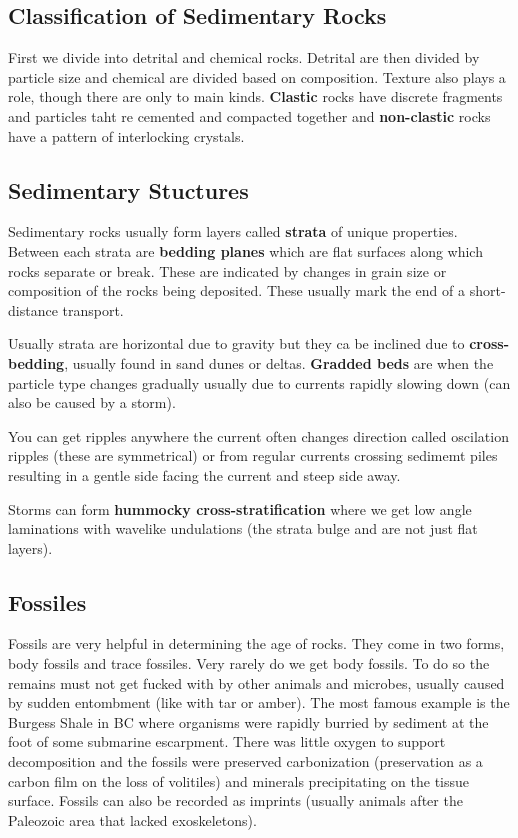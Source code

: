 \documentclass{article}
\begin{document}
\subsection*{Classification of Sedimentary Rocks} %
\label{sub:classification_of_sedimentary_rocks}
First we divide into detrital and chemical rocks. Detrital are then divided by particle size and chemical are divided based on composition. Texture also plays a role, though there are only to main kinds. \textbf{Clastic} rocks have discrete fragments and particles taht re cemented and compacted together and \textbf{non-clastic} rocks have a pattern of interlocking crystals.

\subsection*{Sedimentary Stuctures} %
\label{sub:sedimentary_stuctures}
Sedimentary rocks usually form layers called \textbf{strata} of unique properties. Between each strata are \textbf{bedding planes} which are flat surfaces along which rocks separate or break. These are indicated by changes in grain size or composition of the rocks being deposited. These usually mark the end of a short-distance transport.

Usually strata are horizontal due to gravity but they ca be inclined due to \textbf{cross-bedding}, usually found in sand dunes or deltas. \textbf{Gradded beds} are when the particle type changes gradually usually due to currents rapidly slowing down (can also be caused by a storm).

You can get ripples anywhere the current often changes direction called oscilation ripples (these are symmetrical) or from  regular currents crossing sedimemt piles resulting in a gentle side facing the current and steep side away.

Storms can form \textbf{hummocky cross-stratification} where we get low angle laminations with wavelike undulations (the strata bulge and are not just flat layers).

\subsection*{Fossiles} %
\label{sub:fossiles}
Fossils are very helpful in determining the age of rocks. They come in two forms, body fossils and trace fossiles. Very rarely do we get body fossils. To do so the remains must not get fucked with by other animals and microbes, usually caused by sudden entombment (like with tar or amber). The most famous example is the Burgess Shale in BC where organisms were rapidly burried by sediment at the foot of some submarine escarpment. There was little oxygen to support decomposition and the fossils were preserved carbonization (preservation as a carbon film on the loss of volitiles) and minerals precipitating on the tissue surface. Fossils can also be recorded as imprints (usually animals after the Paleozoic area that lacked exoskeletons).
\end{document}
